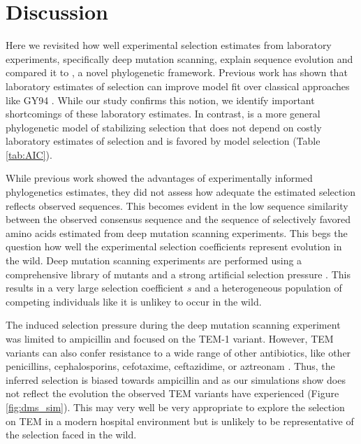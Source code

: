 \documentclass[12pt]{article}
\begin{document}
\section*{Discussion}

Here we revisited how well experimental selection estimates from laboratory experiments, specifically deep mutation scanning, explain sequence evolution and compared it to \selac, a novel phylogenetic framework.
Previous work has shown that laboratory estimates of selection can improve model fit over classical approaches like GY94 \citep{bloom2014, bloom2017}.
While our study confirms this notion, we identify important shortcomings of these laboratory estimates.
In contrast, \selac is a more general phylogenetic model of stabilizing selection that does not depend on costly laboratory estimates of selection and is favored by model selection (Table \ref{tab:AIC}).

While previous work showed the advantages of experimentally informed phylogenetics estimates, they did not assess how adequate the estimated selection reflects observed sequences.
This becomes evident in the low sequence similarity between the observed consensus sequence and the sequence of selectively favored amino acids estimated from deep mutation scanning experiments.
This begs the question how well the experimental selection coefficients represent evolution in the wild.
Deep mutation scanning experiments are performed using a comprehensive library of mutants and a strong artificial selection pressure \citep{FirnbergAndOstermeier2012, Jain2014, FowlerAndFields2014, Fowler2014}.
This results in a very large selection coefficient $s$ and a heterogeneous population of competing individuals like it is unlikey to occur in the wild.

The induced selection pressure during the deep mutation scanning experiment was limited to ampicillin \citep{stiffler2016} and focused on the TEM-1 variant.
However, TEM variants can also confer resistance to a wide range of other antibiotics, like other penicillins, cephalosporins, cefotaxime, ceftazidime, or aztreonam \citep{sougakoff1988,sougakoff1989,goussard1991,mabilat1992,chanal1992,brun1994}.
Thus, the inferred selection is biased towards ampicillin and as our simulations show does not reflect the evolution the observed TEM variants have experienced (Figure \ref{fig:dms_sim}).
This may very well be very appropriate to explore the selection on TEM in a modern hospital environment but is unlikely to be representative of the selection faced in the wild.
\end{document}
